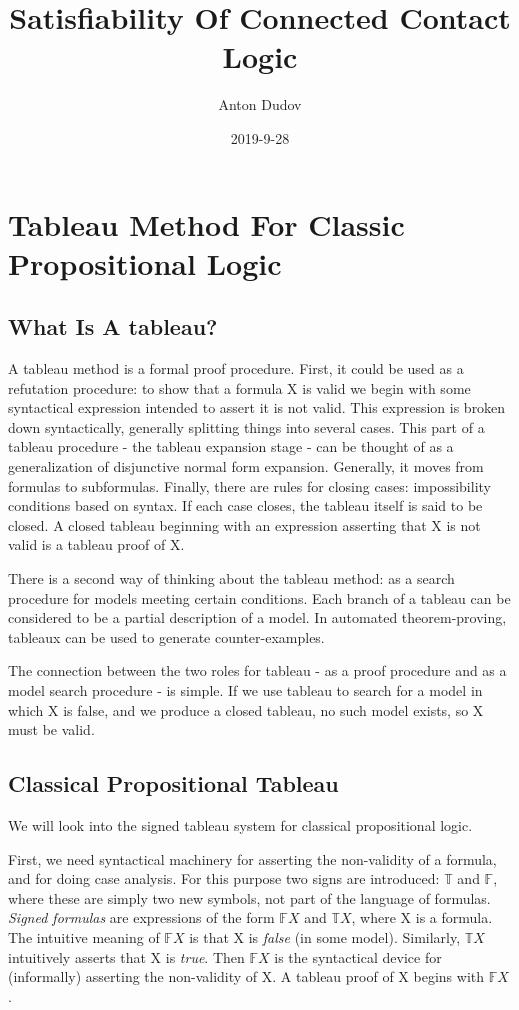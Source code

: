 \documentclass{article}
\title{Satisfiability Of Connected Contact Logic}
\date{2019-9-28}
\author{Anton Dudov}
\newcommand\ST{\mathbb{T}}
\newcommand\SF{\mathbb{F}}
\begin{document}
	\maketitle
	\newpage

	\tableofcontents

	\newpage

	\section{Tableau Method For Classic Propositional Logic}

	\subsection{What Is A tableau?}
	A tableau method is a formal proof procedure. First, it could be used as a refutation procedure: to show that a formula X is valid we begin with some syntactical expression intended to assert it is not valid. This expression is broken down syntactically, generally splitting things into several cases. This part of a tableau procedure - the tableau expansion stage - can be thought of as a generalization of disjunctive normal form expansion. Generally, it moves from formulas to subformulas. Finally, there are rules for closing cases: impossibility conditions based on syntax. If each case closes, the tableau itself is said to be closed. A closed tableau beginning with an expression asserting that X is not valid is a tableau proof of X.
	\par
	There is a second way of thinking about the tableau method: as a search procedure for models meeting certain conditions. Each branch of a tableau can be considered to be a partial description of a model. In automated theorem-proving, tableaux can be used to generate counter-examples.
	\par
	The connection between the two roles for tableau - as a proof procedure and as a model search procedure - is simple. If we use tableau to search for a model in which X is false, and we produce a closed tableau, no such model exists, so X must be valid.

	\subsection{Classical Propositional Tableau}
	We will look into the signed tableau system for classical propositional logic.

	\par
	First, we need syntactical machinery for asserting the non-validity of a formula, and for doing case analysis. For this purpose two signs are introduced: $\ST$ and $\SF$, where these are simply two new symbols, not part of the language of formulas. \textit{Signed formulas} are expressions of the form $\SF X$ and $\ST X$, where X is a formula. The intuitive meaning of $\SF X$ is that X is \textit{false} (in some model). Similarly, $\ST X$ intuitively asserts that X is \textit{true}. Then $\SF X$ is the syntactical device for (informally) asserting the non-validity of X. A tableau proof of X begins with $\SF X$.
\end{document}
